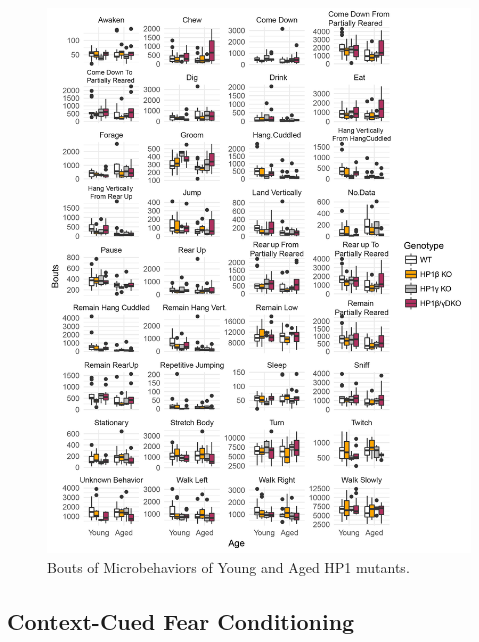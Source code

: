 \documentclass[onehalf,12pt]{beavtex}
\begin{document}
  \begin{figure}
  
  {\centering \includegraphics[width=1\linewidth, ]{./figure/results/HCSbouts} 
  
  }
  
  \caption[Bouts of Microbehaviors of Young and Aged HP1 mutants]{Bouts of Microbehaviors of Young and Aged HP1 mutants.}\label{fig:HCSbouts}
  \end{figure}
  
  \FloatBarrier
  \newpage
  
  \subsection{Context-Cued Fear
  Conditioning}\label{context-cued-fear-conditioning-1}
  
\end{document}
